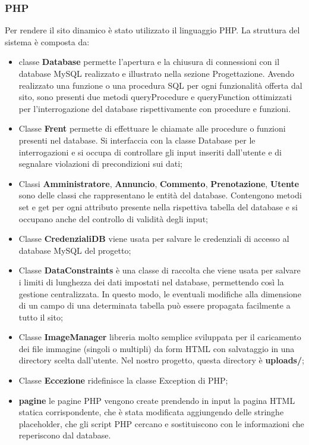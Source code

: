 \documentclass[1_relazione.tex]{subfiles}
\begin{document}
\subsubsection{PHP}
Per rendere il sito dinamico \`{e} stato utilizzato il linguaggio PHP.
La struttura del sistema \`{e} composta da:
\begin{itemize}
    \item classe \textbf{Database} permette l'apertura e la chiusura di connessioni con il database MySQL realizzato e illustrato nella sezione Progettazione.
    Avendo realizzato una funzione o una procedura SQL per ogni funzionalit\`{a} offerta dal sito, sono presenti due metodi queryProcedure e queryFunction ottimizzati per l'interrogazione del database rispettivamente con procedure e funzioni.
    \item Classe \textbf{Frent} permette di effettuare le chiamate alle procedure o funzioni presenti nel database. Si interfaccia con la classe Database per le interrogazioni e si occupa di controllare gli input inseriti dall'utente e di segnalare violazioni di precondizioni sui dati;
    \item Classi \textbf{Amministratore}, \textbf{Annuncio}, \textbf{Commento}, \textbf{Prenotazione}, \textbf{Utente} sono delle classi che rappresentano le entit\`{a} del database. Contengono metodi set e get per ogni attributo presente nella rispettiva tabella del database e si occupano anche del controllo di validit\`{a} degli input;
    \item Classe \textbf{CredenzialiDB} viene usata per salvare le credenziali di accesso al database MySQL del progetto;
    \item Classe \textbf{DataConstraints} \`{e} una classe di raccolta che viene usata per salvare i limiti di lunghezza dei dati impostati nel database, permettendo cos\`{i} la gestione centralizzata. In questo modo, le eventuali modifiche alla dimensione di un campo di una determinata tabella pu\`{o} essere propagata facilmente a tutto il sito;
    \item Classe \textbf{ImageManager} libreria molto semplice sviluppata per il caricamento dei file immagine (singoli o multipli) da form HTML con salvataggio in una directory scelta dall'utente. Nel nostro progetto, questa directory è \textbf{uploads/};
    \item Classe \textbf{Eccezione} ridefinisce la classe Exception di PHP;
    \item \textbf{pagine} le pagine PHP vengono create prendendo in input la pagina HTML statica corrispondente, che è stata modificata aggiungendo delle stringhe placeholder, che gli script PHP cercano e sostituiscono con le informazioni che reperiscono dal database.

\end{itemize}
\end{document}
